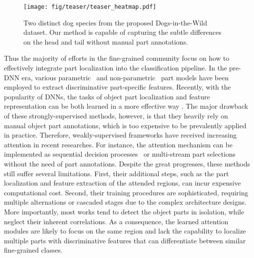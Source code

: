 \documentclass[runningheads]{llncs}
\begin{document}
\begin{figure}
\centering
\texttt{[image: fig/teaser/teaser\_heatmap.pdf]}
\caption{Two distinct dog species from the proposed Dogs-in-the-Wild dataset. Our method is capable of capturing the subtle differences on the head and tail without manual part annotations.}
\label{fig:teaser}
\vspace{-.1in}
\end{figure}

Thus the majority of efforts in the fine-grained community focus on how to effectively integrate part localization into the classification pipeline.
In the pre-DNN era, various parametric~\cite{farrell2011birdlets,LinMHD14,parkhi2011truth} and non-parametric~\cite{LiuKJB12} part models have been employed to extract discriminative part-specific features.
Recently, with the popularity of DNNs, the tasks of object part localization and feature representation can be both learned in a more effective way \cite{lin2015deep,krause2015fine,branson2014bird,zhang2014part,zhang2014panda}.
The major drawback of these strongly-supervised methods, however, is that they heavily rely on manual object part annotations, which is too expensive to be prevalently applied in practice.
Therefore, weakly-supervised frameworks have received increasing attention in recent researches.
For instance, the attention mechanism can be implemented as sequential decision processes~\cite{MnihHGK14} or multi-stream part selections~\cite{fu2017look} without the need of part annotations.
Despite the great progresses, these methods still suffer several limitations.
First, their additional steps, such as the part localization and feature extraction of the attended regions, can incur expensive computational cost.
Second, their training procedures are sophisticated, requiring multiple alternations or cascaded stages due to the complex architecture designs.
More importantly, most works tend to detect the object parts in isolation, while neglect their inherent correlations.
As a consequence, the learned attention modules are likely to focus on the same region and lack the capability to localize multiple parts with discriminative features that can differentiate between similar fine-grained classes.
\end{document}

